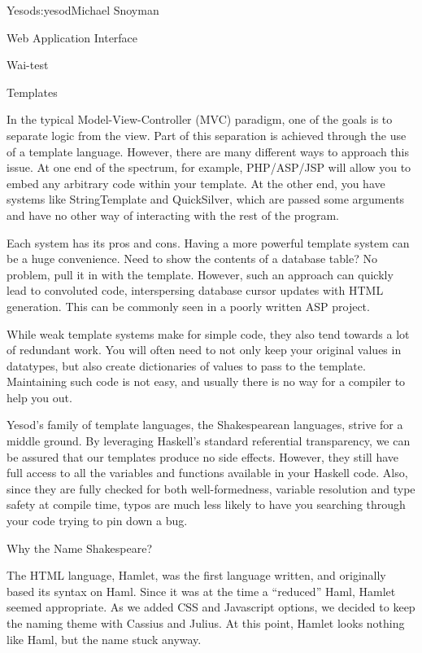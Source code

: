 \begin{aosachapter}{Yesod}{s:yesod}{Michael Snoyman}
\begin{aosasect1}{Web Application Interface}
\begin{aosasect2}{Wai-test}
\end{aosasect2}

\end{aosasect1}

\begin{aosasect1}{Templates}

In the typical Model-View-Controller (MVC) paradigm, one of the goals
is to separate logic from the view. Part of this separation is
achieved through the use of a template language. However, there are
many different ways to approach this issue. At one end of the
spectrum, for example, PHP/ASP/JSP will allow you to embed any
arbitrary code within your template. At the other end, you have
systems like StringTemplate and QuickSilver, which are passed some
arguments and have no other way of interacting with the rest of the
program.

Each system has its pros and cons. Having a more powerful template
system can be a huge convenience. Need to show the contents of a
database table? No problem, pull it in with the template. However,
such an approach can quickly lead to convoluted code, interspersing
database cursor updates with HTML generation. This can be commonly
seen in a poorly written ASP project.

While weak template systems make for simple code, they also tend
towards a lot of redundant work. You will often need to not only keep
your original values in datatypes, but also create dictionaries of
values to pass to the template. Maintaining such code is not easy, and
usually there is no way for a compiler to help you out.

Yesod's family of template languages, the Shakespearean languages,
strive for a middle ground. By leveraging Haskell's standard
referential transparency, we can be assured that our templates produce
no side effects. However, they still have full access to all the
variables and functions available in your Haskell code. Also, since
they are fully checked for both well-formedness, variable resolution
and type safety at compile time, typos are much less likely to have
you searching through your code trying to pin down a bug.

\begin{aosabox}{Why the Name Shakespeare?}

The HTML language, Hamlet, was the first language written, and
originally based its syntax on Haml. Since it was at the time a
``reduced'' Haml, Hamlet seemed appropriate. As we added CSS and
Javascript options, we decided to keep the naming theme with Cassius
and Julius. At this point, Hamlet looks nothing like Haml, but the
name stuck anyway.


\end{aosabox}
\end{aosasect1}
\end{aosachapter}
